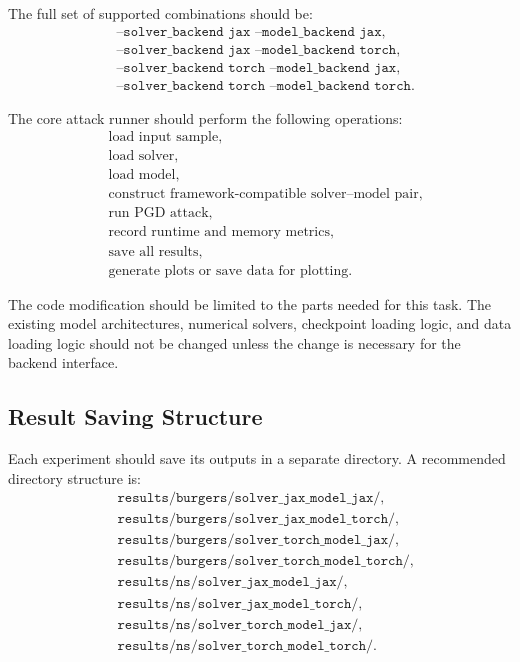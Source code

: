 \documentclass{article}
\begin{document}
The full set of supported combinations should be:
\[
\begin{aligned}
&\texttt{--solver\_backend jax --model\_backend jax},\\
&\texttt{--solver\_backend jax --model\_backend torch},\\
&\texttt{--solver\_backend torch --model\_backend jax},\\
&\texttt{--solver\_backend torch --model\_backend torch}.
\end{aligned}
\]

The core attack runner should perform the following operations:
\[
\begin{aligned}
&\text{load input sample},\\
&\text{load solver},\\
&\text{load model},\\
&\text{construct framework-compatible solver--model pair},\\
&\text{run PGD attack},\\
&\text{record runtime and memory metrics},\\
&\text{save all results},\\
&\text{generate plots or save data for plotting}.
\end{aligned}
\]

The code modification should be limited to the parts needed for this task. The existing model architectures, numerical solvers, checkpoint loading logic, and data loading logic should not be changed unless the change is necessary for the backend interface.

\subsection{Result Saving Structure}

Each experiment should save its outputs in a separate directory. A recommended directory structure is:
\[
\begin{aligned}
&\texttt{results/burgers/solver\_jax\_model\_jax/},\\
&\texttt{results/burgers/solver\_jax\_model\_torch/},\\
&\texttt{results/burgers/solver\_torch\_model\_jax/},\\
&\texttt{results/burgers/solver\_torch\_model\_torch/},\\
&\texttt{results/ns/solver\_jax\_model\_jax/},\\
&\texttt{results/ns/solver\_jax\_model\_torch/},\\
&\texttt{results/ns/solver\_torch\_model\_jax/},\\
&\texttt{results/ns/solver\_torch\_model\_torch/}.
\end{aligned}
\]
\end{document}
